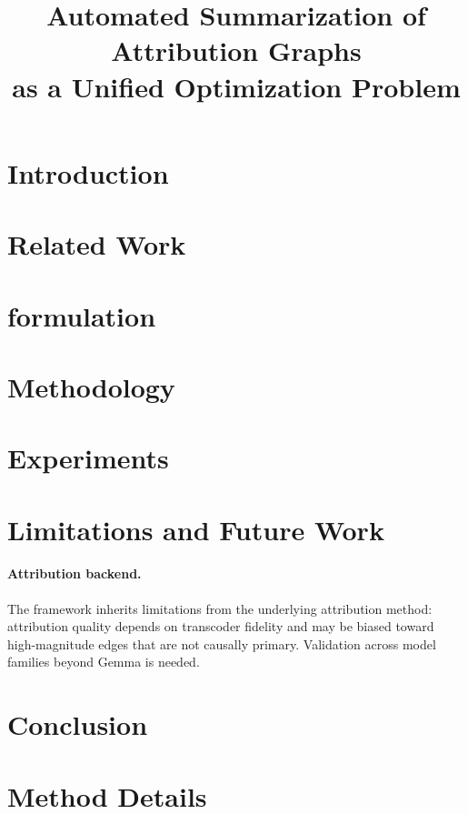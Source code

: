 \documentclass[table, 11pt]{article}
\title{Automated Summarization of Attribution Graphs \\
as a Unified Optimization Problem}
\author{}
\begin{document}
\maketitle

\begin{abstract}
\end{abstract}

\section{Introduction}

\section{Related Work}

\section{formulation}

\section{Methodology}


\section{Experiments}


\section{Limitations and Future Work}
\paragraph{Attribution backend.}
The framework inherits limitations from the underlying attribution
method: attribution quality depends on transcoder fidelity and may
be biased toward high-magnitude edges that are not causally primary.
Validation across model families beyond Gemma is needed.

\section{Conclusion}




\appendix

\section{Method Details}\label{app:method}
\end{document}
